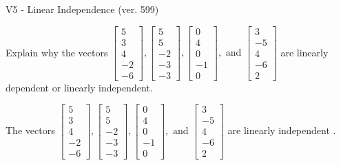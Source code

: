 \begin{exercise}
  \begin{exerciseTitle}V5 - Linear Independence (ver. 599)\end{exerciseTitle}
  \begin{exerciseStatement}
    Explain why the vectors \(\left[\begin{array}{r}
5 \\
3 \\
4 \\
-2 \\
-6
\end{array}\right] , \left[\begin{array}{r}
5 \\
5 \\
-2 \\
-3 \\
-3
\end{array}\right] , \left[\begin{array}{r}
0 \\
4 \\
0 \\
-1 \\
0
\end{array}\right] , \text{ and } \left[\begin{array}{r}
3 \\
-5 \\
4 \\
-6 \\
2
\end{array}\right]\) are linearly dependent or linearly independent.	


  \end{exerciseStatement}
  \begin{exerciseAnswer}
   The vectors \(\left[\begin{array}{r}
5 \\
3 \\
4 \\
-2 \\
-6
\end{array}\right] , \left[\begin{array}{r}
5 \\
5 \\
-2 \\
-3 \\
-3
\end{array}\right] , \left[\begin{array}{r}
0 \\
4 \\
0 \\
-1 \\
0
\end{array}\right] , \text{ and } \left[\begin{array}{r}
3 \\
-5 \\
4 \\
-6 \\
2
\end{array}\right]\) are 
  	 linearly independent  .
  


  \end{exerciseAnswer}
\end{exercise}